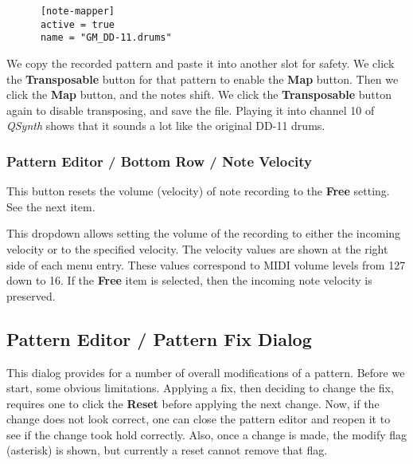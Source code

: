    \begin{verbatim}
      [note-mapper]
      active = true
      name = "GM_DD-11.drums"
   \end{verbatim}

   We copy the recorded pattern and paste it into another slot for safety.
   We click the \textbf{Transposable} button for that pattern to enable the
   \textbf{Map} button.  Then we click the \textbf{Map} button, and the notes
   shift.  
   We click the \textbf{Transposable} button again to disable transposing,
   and save the file.
   Playing it into channel 10 of \textsl{QSynth} shows that it sounds a lot
   like the original DD-11 drums.

\subsubsection{Pattern Editor / Bottom Row / Note Velocity}
\label{subsubsec:pattern_editor_bottom_note_velocity}

   \setcounter{ItemCounter}{0}      %

   This button resets the volume (velocity)
   of note recording to the \textbf{Free} setting.
   See the next item.

   This dropdown allows setting the volume of the recording to either the
   incoming velocity or to the specified velocity.
   The velocity values are shown at the right side of each menu entry.
   These values correspond to MIDI volume levels from 127 down to 16.
   If the \textbf{Free} item is selected, then the incoming note velocity is
   preserved.

\subsection{Pattern Editor / Pattern Fix Dialog}
\label{subsec:pattern_editor_pattern_fix}

   This dialog provides for a number of overall modifications of a pattern.
   Before we start, some obvious limitations.
   Applying a fix, then deciding to change the fix, requires
   one to click the \textbf{Reset} before applying the next change.
   Now, if the change does not look correct, one can close the pattern
   editor and reopen it to see if the change took hold correctly.
   Also, once a change is made, the modify flag (asterisk) is shown,
   but currently a reset cannot remove that flag.


